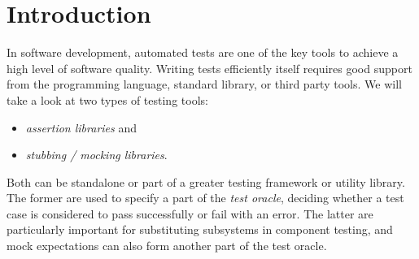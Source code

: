 \chapter{Introduction}
In software development, automated tests are one of the key tools
to achieve a high level of software quality.
Writing tests efficiently itself requires good support
from the programming language, standard library, or third party tools.
We will take a look at two types of testing tools:
\begin{itemize}
  \item \textit{assertion libraries} and
  \item \textit{stubbing / mocking libraries}.
\end{itemize}
Both can be standalone or part of a greater testing framework or utility library.
The former are used to specify a part of the \textit{test oracle},
deciding whether a test case is considered to pass successfully or fail with an error.
The latter are particularly important for substituting subsystems in component testing,
and mock expectations can also form another part of the test oracle.
